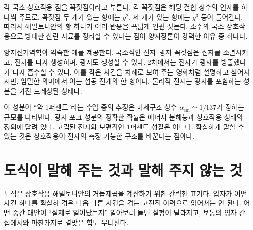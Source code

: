 각 국소 상호작용 점을 꼭짓점이라고 부른다. 각 꼭짓점은 해당 결합 상수의 인자를 하나씩 주므로, 꼭짓점 두 개가 있는 항에는 \(g^2\), 세 개가 있는 항에는 \(g^3\) 등이 들어간다. 따라서 해밀토니안의 항 하나가 여러 반응을 폭넓게 연관 짓는다. 소수의 국소 상호작용으로 방대한 산란 자료를 정리할 수 있다는 점이 양자장론이 강력한 이유 중 하나다.

\begin{classroomqa}\end{classroomqa}

양자전기역학이 익숙한 예를 제공한다. 국소적인 전자--광자 꼭짓점은 전자를 소멸시키고, 전자를 다시 생성하며, 광자도 생성할 수 있다. 2차에서는 전자가 광자를 방출했다가 다시 흡수할 수 있다. 이를 작은 사건을 차례로 보여 주는 영화처럼 설명하고 싶어지지만, 엄밀한 의미에서 이는 섭동 전개의 한 항이다. 물리적 전자는 광자를 포함하는 성분을 가진 드레싱된 상태다.

이 성분이 ``약 1퍼센트''라는 수업 중의 추정은 미세구조 상수 \(\alpha_{\mathrm{em}}\simeq 1/137\)가 정하는 규모를 나타낸다. 광자 포크 성분의 정확한 확률은 에너지 분해능과 상호작용 상태의 정의에 달려 있다. 고립된 전자의 보편적인 1퍼센트 성질은 아니다. 확실하게 말할 수 있는 것은 상호작용이 전자의 측정 가능한 구조를 바꾼다는 점이다.

\section{도식이 말해 주는 것과 말해 주지 않는 것}

도식은 상호작용 해밀토니안의 거듭제곱을 계산하기 위한 간략한 표기다. 입자가 어떤 사건 하나를 확실히 겪은 다음 다른 사건을 겪는 고전적 이력으로 읽어서는 안 된다. 어떤 중간 대안이 ``실제로 일어났는지'' 알아보려 들면 실험이 달라지고, 보통의 양자 간섭에서와 마찬가지로 결맞은 합도 무너진다.

\begin{classroomqa}\end{classroomqa}

